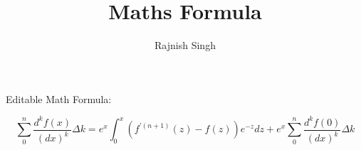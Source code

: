 \documentclass{article}
\title{Maths Formula}
\author{Rajnish Singh}
\begin{document}
        \maketitle

        Editable Math Formula:

        \[
        \sum_{0}^{n}\frac{d^{k}f(x)}{(d x)^{k}}\Delta k=e^{x}\int_{0}^{x}\left(f^{\prime(n+1)}(z)-f(z)\right)e^{-z}d z+e^{x}\sum_{0}^{n}\frac{d^{k}f(0)}{(d x)^{k}}\Delta k
        \]

        
\end{document}
